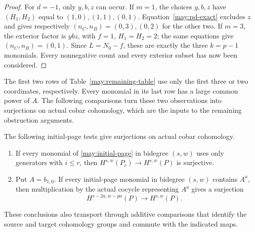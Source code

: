 \begin{proof}
For $d=-1$, only $y,b,z$ can occur.  If $m=1$, the choices $y,b,z$
have $(H_1,H_2)$ equal to $(1,0),(1,1),(0,1)$.
Equation~\eqref{may:pd-exact} excludes $z$ and gives respectively
$(n_C,n_B)=(0,3),(0,2)$ for the other two.  If $m=3$, the exterior
factor is $ybz$, with $f=1$, $H_1=H_2=2$; the same equations give
$(n_C,n_B)=(0,1)$.  Since $L=N_0-f$, these are exactly the three
$k=p-1$ monomials.  Every nonnegative count and every exterior subset
has now been considered.
\end{proof}

The first two rows of Table~\ref{may:remaining-table} use only the first
three or two coordinates, respectively. Every monomial in its last row
has a large common power of $A$. The following comparisons turn these
two observations into surjections on actual cobar cohomology, which are
the inputs to the remaining obstruction arguments.

\begin{lemma}
\label{may:comparison}
The following initial-page tests give surjections on actual cobar
cohomology.
\begin{enumerate}
 \item If every monomial of \eqref{may:initial-page} in bidegree
 $(s,w)$ uses only generators with $i\leq r$, then
 $H^{s,w}(P_r)\longrightarrow H^{s,w}(P)$ is surjective.
 \item Put $A=b_{1,0}$. If every initial-page monomial in bidegree
 $(s,w)$ contains $A^a$, then multiplication by the actual cocycle
 representing $A^a$ gives a surjection
 \[
 H^{s-2a,w-pa}(P)\longrightarrow H^{s,w}(P).
 \]
\end{enumerate}
These conclusions also transport through additive comparisons that
identify the source and target cohomology groups and commute with the
indicated maps.
\end{lemma}

